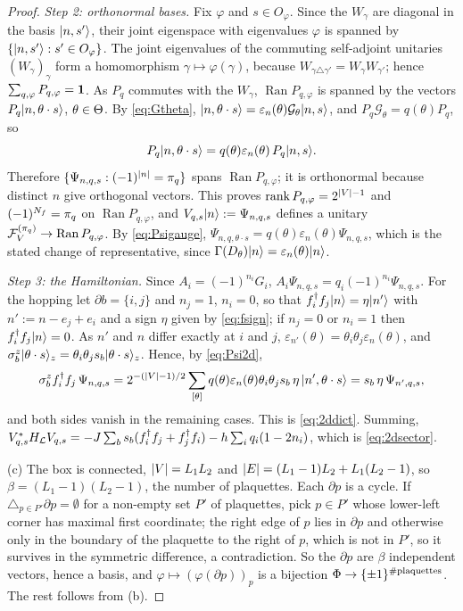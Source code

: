 \begin{proof}
\emph{Step 2: orthonormal bases.}  Fix $\varphi$ and $s\in O_\varphi$.  Since the $W_\gamma$ are diagonal in the
basis $|n,s'\rangle$, their joint eigenspace with eigenvalues $\varphi$ is spanned by $\{|n,s'\rangle:s'\in O_\varphi\}$.
The joint eigenvalues of the commuting self-adjoint unitaries $(W_\gamma)_\gamma$ form a homomorphism
$\gamma\mapsto\varphi(\gamma)$, because $W_{\gamma\triangle\gamma'}=W_\gamma W_{\gamma'}$; hence
$\sum_{q,\varphi}P_{q,\varphi}=\mathbf{1}$.  As $P_q$ commutes with the $W_\gamma$, $\operatorname{Ran}P_{q,\varphi}$ is
spanned by the vectors $P_q|n,\theta\cdot s\rangle$, $\theta\in\Theta$.  By \eqref{eq:Gtheta},
$|n,\theta\cdot s\rangle=\varepsilon_n(\theta)\mathcal G_\theta|n,s\rangle$, and $P_q\mathcal G_\theta=q(\theta)P_q$, so
\begin{equation}\label{eq:Psigauge}
  P_q|n,\theta\cdot s\rangle=q(\theta)\varepsilon_n(\theta)\,P_q|n,s\rangle.
\end{equation}
Therefore $\{\Psi_{n,q,s}:(-1)^{\left|n\right|}=\pi_q\}$ spans $\operatorname{Ran}P_{q,\varphi}$; it is orthonormal because
distinct $n$ give orthogonal vectors.  This proves $\operatorname{rank}P_{q,\varphi}=2^{\left|V\right|-1}$ and
$(-1)^{N_f}=\pi_q$ on $\operatorname{Ran}P_{q,\varphi}$, and $V_{q,s}|n\rangle:=\Psi_{n,q,s}$ defines a unitary
$\mathcal{F}_V^{(\pi_q)}\to\operatorname{Ran}P_{q,\varphi}$.  By \eqref{eq:Psigauge},
$\Psi_{n,q,\theta\cdot s}=q(\theta)\varepsilon_n(\theta)\Psi_{n,q,s}$, which is the stated change of representative,
since $\Gamma(D_\theta)|n\rangle=\varepsilon_n(\theta)|n\rangle$.

\emph{Step 3: the Hamiltonian.}  Since $A_i=(-1)^{n_i}G_i$, $A_i\Psi_{n,q,s}=q_i(-1)^{n_i}\Psi_{n,q,s}$.  For the
hopping let $\partial b=\{i,j\}$ and $n_j=1$, $n_i=0$, so that $f_i^\dagger f_j|n\rangle=\eta|n'\rangle$ with
$n':=n-e_j+e_i$ and a sign $\eta$ given by \eqref{eq:fsign}; if $n_j=0$ or $n_i=1$ then $f_i^\dagger f_j|n\rangle=0$.
As $n'$ and $n$ differ exactly at $i$ and $j$, $\varepsilon_{n'}(\theta)=\theta_i\theta_j\varepsilon_n(\theta)$, and
$\sigma^z_b|\theta\cdot s\rangle_z=\theta_i\theta_js_b|\theta\cdot s\rangle_z$.  Hence, by \eqref{eq:Psi2d},
\[
  \sigma^z_bf_i^\dagger f_j\,\Psi_{n,q,s}
  =2^{-(\left|V\right|-1)/2}\sum_{[\theta]}q(\theta)\varepsilon_n(\theta)\theta_i\theta_js_b\,\eta\,|n',\theta\cdot s\rangle
  =s_b\,\eta\,\Psi_{n',q,s},
\]
and both sides vanish in the remaining cases.  This is \eqref{eq:2ddict}.  Summing,
$V_{q,s}^*H_{\mathcal{L}} V_{q,s}=-J\sum_bs_b(f_i^\dagger f_j+f_j^\dagger f_i)-h\sum_iq_i(1-2n_i)$, which is
\eqref{eq:2dsector}.

(c) The box is connected, $\left|V\right|=L_1L_2$ and $\left|E\right|=(L_1-1)L_2+L_1(L_2-1)$, so $\beta=(L_1-1)(L_2-1)$, the
number of plaquettes.  Each $\partial p$ is a cycle.  If $\triangle_{p\in P'}\partial p=\emptyset$ for a non-empty set
$P'$ of plaquettes, pick $p\in P'$ whose lower-left corner has maximal first coordinate; the right edge of $p$
lies in $\partial p$ and otherwise only in the boundary of the plaquette to the right of $p$, which is not in
$P'$, so it survives in the symmetric difference, a contradiction.  So the $\partial p$ are $\beta$ independent
vectors, hence a basis, and $\varphi\mapsto(\varphi(\partial p))_p$ is a bijection
$\Phi\to\{\pm1\}^{\#\text{plaquettes}}$.  The rest follows from (b).


\end{proof}
